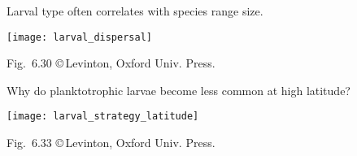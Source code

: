 \documentclass[t]{beamer}
\begin{document}
%
\begin{frame}[t]{Larval type often correlates with species range size.}

	\texttt{[image: larval\_dispersal]}

	\vfilll

	\hfill \tiny Fig.~6.30 \copyright\,Levinton, Oxford Univ. Press.
\end{frame}
%
\begin{frame}[t]{Why do planktotrophic larvae become less common at high latitude?}

	\texttt{[image: larval\_strategy\_latitude]}

	\vfilll

	\hfill \tiny Fig.~6.33 \copyright\,Levinton, Oxford Univ. Press.
\end{frame}
\end{document}
